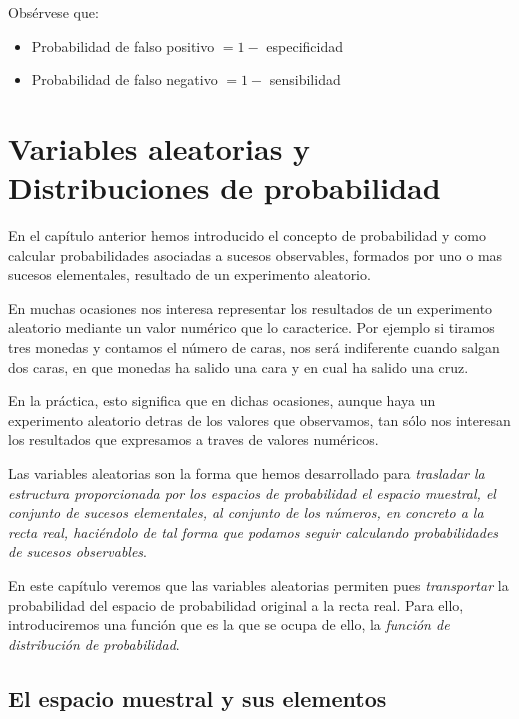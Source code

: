 \documentclass[
  a4paper,
  DIV=11,
  numbers=noendperiod]{scrreprt}
\begin{document}
Obsérvese que:

\begin{itemize}
\item
  Probabilidad de falso positivo \(=1-\) especificidad
\item
  Probabilidad de falso negativo \(=1-\) sensibilidad
\end{itemize}


\chapter{Variables aleatorias y Distribuciones de
probabilidad}\label{variables-aleatorias-y-distribuciones-de-probabilidad}

En el capítulo anterior hemos introducido el concepto de probabilidad y
como calcular probabilidades asociadas a sucesos observables, formados
por uno o mas sucesos elementales, resultado de un experimento
aleatorio.

En muchas ocasiones nos interesa representar los resultados de un
experimento aleatorio mediante un valor numérico que lo caracterice. Por
ejemplo si tiramos tres monedas y contamos el número de caras, nos será
indiferente cuando salgan dos caras, en que monedas ha salido una cara y
en cual ha salido una cruz.

En la práctica, esto significa que en dichas ocasiones, aunque haya un
experimento aleatorio detras de los valores que observamos, tan sólo nos
interesan los resultados que expresamos a traves de valores numéricos.

Las variables aleatorias son la forma que hemos desarrollado para
\emph{trasladar la estructura proporcionada por los espacios de
probabilidad el espacio muestral, el conjunto de sucesos elementales, al
conjunto de los números, en concreto a la recta real, haciéndolo de tal
forma que podamos seguir calculando probabilidades de sucesos
observables}.

En este capítulo veremos que las variables aleatorias permiten pues
\emph{transportar} la probabilidad del espacio de probabilidad original
a la recta real. Para ello, introduciremos una función que es la que se
ocupa de ello, la \emph{función de distribución de probabilidad}.

\section{El espacio muestral y sus
elementos}\label{el-espacio-muestral-y-sus-elementos}
\end{document}
